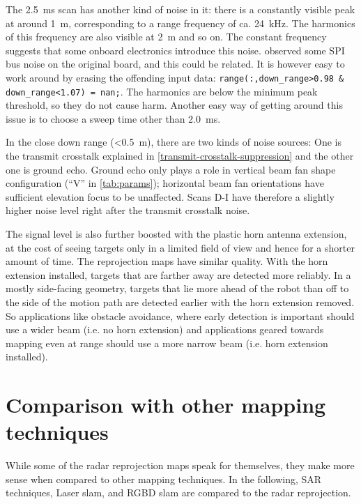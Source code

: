 The \SI{2.5}{ms} scan has another kind of noise in it: there is a constantly visible peak at around \SI{1}{m}, corresponding to a range frequency of ca. \SI{24}{kHz}. The harmonics of this frequency are also visible at \SI{2}{m} and so on. The constant frequency suggests that some onboard electronics introduce this noise. \cite{Ernst2016} observed some SPI bus noise on the original board, and this could be related. It is however easy to work around by erasing the offending input data: \texttt{range(:,down\_range>0.98 \& down\_range<1.07) = nan;}. The harmonics are below the minimum peak threshold, so they do not cause harm. Another easy way of getting around this issue is to choose a sweep time other than \SI{2.0}{ms}.

In the close down range (<\SI{0.5}{m}), there are two kinds of noise sources: One is the transmit crosstalk explained in \cref{transmit-crosstalk-suppression} and the other one is ground echo. Ground echo only plays a role in vertical beam fan shape configuration (``V'' in \cref{tab:params}); horizontal beam fan orientations have sufficient elevation focus to be unaffected. Scans D-I have therefore a slightly higher noise level right after the transmit crosstalk noise.

The signal level is also further boosted with the plastic horn antenna extension, at the cost of seeing targets only in a limited field of view and hence for a shorter amount of time. The reprojection maps have similar quality. With the horn extension installed, targets that are farther away are detected more reliably. In a mostly side-facing geometry, targets that lie more ahead of the robot than off to the side of the motion path are detected earlier with the horn extension removed. So applications like obstacle avoidance, where early detection is important should use a wider beam (i.e. no horn extension) and applications geared towards mapping even at range should use a more narrow beam (i.e. horn extension installed).



\section{Comparison with other mapping techniques} \label{comparison-with-other-mapping-techniques}

While some of the radar reprojection maps speak for themselves, they
make more sense when compared to other mapping techniques. In the
following, SAR techniques, Laser slam, and RGBD slam are compared to the
radar reprojection.

